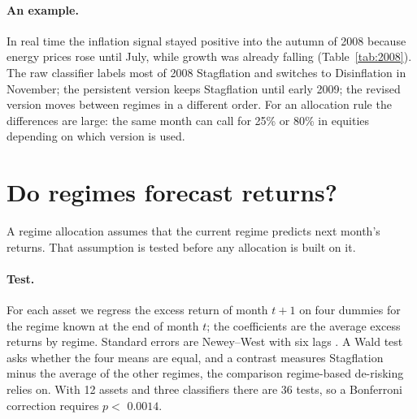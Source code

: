 \documentclass[11pt,a4paper]{article}
\begin{document}
\paragraph{An example.} In real time the inflation signal stayed positive into the autumn of 2008 because
energy prices rose until July, while growth was already falling (Table~\ref{tab:2008}). The raw classifier
labels most of 2008 Stagflation and switches to Disinflation in November; the persistent version keeps
Stagflation until early 2009; the revised version moves between regimes in a different order. For an
allocation rule the differences are large: the same month can call for 25\% or 80\% in equities depending on
which version is used.

\section{Do regimes forecast returns?}
\label{sec:predict}

A regime allocation assumes that the current regime predicts next month's returns. That assumption is tested before any allocation is built on it.


\paragraph{Test.} For each asset we regress the excess return of month $t+1$ on four dummies for the regime known
at the end of month $t$; the coefficients are the average excess returns by regime. Standard errors are
Newey--West with six lags \citep{newey1987}. A Wald test asks whether the four means are equal, and a contrast
measures Stagflation minus the average of the other regimes, the comparison regime-based de-risking relies on.
With 12 assets and three classifiers there are 36 tests, so a Bonferroni correction requires
$p<$ $0.0014$.
\end{document}
